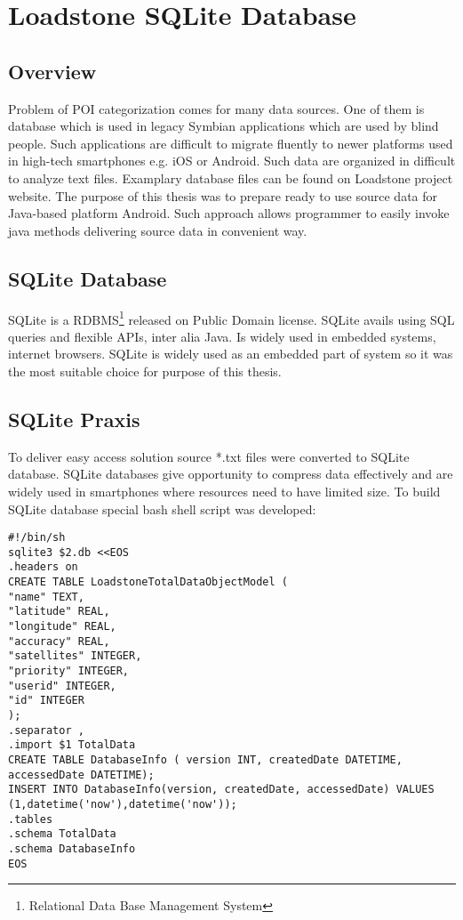 \chapter{Loadstone SQLite Database}\label{chap.loadstone}

\section{Overview}
Problem of POI categorization comes for many data sources. One of them is database which is used in legacy Symbian applications which are used by blind people. Such applications are difficult to migrate fluently to newer platforms used in high-tech smartphones e.g. iOS or Android. Such data are organized in difficult to analyze text files. Examplary database files can be found on Loadstone project website. \cite{29} The purpose of this thesis was to prepare ready to use source data for Java-based platform Android. Such approach allows programmer to easily invoke java methods delivering source data in convenient way.

\section{SQLite Database}
SQLite is a RDBMS\footnote{Relational Data Base Management System} released on Public Domain license. SQLite avails using SQL queries and flexible APIs, inter alia Java. Is widely used in embedded systems, internet browsers. SQLite is widely used as an embedded part of system so it was the most suitable choice for purpose of this thesis.
\section{SQLite Praxis}
To deliver easy access solution source *.txt files were converted to SQLite database. SQLite databases give opportunity to compress data effectively and are widely used in smartphones where resources need to have limited size. To build SQLite database special bash shell script was developed:

\begin{lstlisting}[style=BASH]	
#!/bin/sh
sqlite3 $2.db <<EOS
.headers on
CREATE TABLE LoadstoneTotalDataObjectModel (
"name" TEXT,
"latitude" REAL,
"longitude" REAL,
"accuracy" REAL,
"satellites" INTEGER,
"priority" INTEGER,
"userid" INTEGER,
"id" INTEGER
);
.separator ,
.import $1 TotalData
CREATE TABLE DatabaseInfo ( version INT, createdDate DATETIME, accessedDate DATETIME);
INSERT INTO DatabaseInfo(version, createdDate, accessedDate) VALUES (1,datetime('now'),datetime('now'));
.tables
.schema TotalData
.schema DatabaseInfo
EOS
\end{lstlisting}

